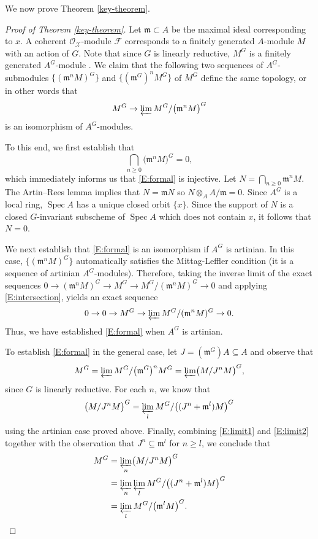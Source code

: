 \documentclass[a4paper]{amsart}
\theoremstyle{plain}
\theoremstyle{definition}
\theoremstyle{remark}
\numberwithin{equation}{section}
\newcommand{\fm}{\mathfrak{m}}
\newcommand\cF{\mathcal{F}}
\newcommand\cX{\mathcal{X}}
\newcommand\oh{\mathcal{O}}
\DeclareMathOperator{\Spec}{Spec}
\newcommand{\ilim}{\varprojlim}
\newcommand{\tensor}{\otimes}
\begin{document}
We now prove Theorem \ref{key-theorem}.
\begin{proof}[Proof of Theorem \ref{key-theorem}]
 Let $\fm \subset A$ be the maximal ideal corresponding to $x$.  A coherent $\oh_{\cX}$-module $\cF$ corresponds to a finitely generated $A$-module $M$ with an action of $G$.
Note that since $G$ is linearly reductive, $M^G$ is a finitely generated $A^G$-module \cite[Thm.\ 4.16(x)]{alper-good}.  We claim that the following two sequences of $A^G$-submodules $\{(\fm^{n} M)^{G} \}$ and $\{ (\fm^G)^n M^{G} \}$ of $M^{G}$ define the same topology, or in other words that 
\begin{equation} \label{E:formal}
M^{G}  \to  \ilim M^{G} / \bigl(\fm^{n} M\bigr)^{G}
\end{equation}
 is an isomorphism of $A^G$-modules.  
 
To this end, we first establish that
\begin{equation} \label{E:intersection}
 \bigcap_{n \ge 0} \bigl(\fm^n M\bigr)^{G} = 0,
 \end{equation} 
 which immediately informs us that \eqref{E:formal} is injective.
 Let $N =  \bigcap_{n \ge 0} \fm^n M$. The Artin--Rees lemma implies that $N=\fm N$ so $N \tensor_A A/\fm = 0$.
 Since $A^G$ is a local ring, $\Spec A$ has a unique closed orbit $\{x\}$.
 Since the support of $N$ is a closed $G$-invariant
 subscheme of $\Spec A$ which does not contain $x$, it follows that $N=0$.

We next establish that \eqref{E:formal} is an isomorphism if $A^G$ is artinian.  In this case, $\{(\fm^n M)^G\}$ automatically satisfies the Mittag-Leffler condition (it is a sequence of artinian $A^G$-modules).  Therefore, taking the inverse limit of the exact sequences $0 \to (\fm^n M)^G \to M^G \to M^G / (\fm^n M)^G \to 0$ and applying \eqref{E:intersection}, yields an exact sequence
$$0 \to 0 \to M^G \to \ilim M^G / (\fm^n M)^G \to 0.$$
Thus, we have established \eqref{E:formal} when $A^G$ is artinian.

To establish \eqref{E:formal} in the general case, let $J = (\fm^G) A \subseteq A$ and observe that
\begin{equation} \label{E:limit1}
M^G = \ilim M^G / \bigl(\fm^G\bigr)^n M^G = \ilim \bigl(M/J^n M\bigr)^G,
\end{equation}
since $G$ is linearly reductive.
For each $n$, 
we know that
\begin{equation} \label{E:limit2}
\bigl(M/J^nM\bigr)^G = \ilim_l M^G / \bigl((J^n + \fm^l)M \bigr)^G
\end{equation}
using the artinian case proved above.  Finally, combining \eqref{E:limit1} and \eqref{E:limit2} together with the observation that $J^n \subseteq \fm^l$ for $n \ge l$, we conclude that
$$\begin{aligned}
M^G & = \ilim_n \bigl(M / J^n M\bigr)^G \\
	& = \ilim_n \ilim_l M^G / \bigl((J^n + \fm^l)M \bigr)^G \\
	& = \ilim_l M^G / \bigl(\fm^l M\bigr)^G.
\end{aligned}$$


\end{proof}
\end{document}
